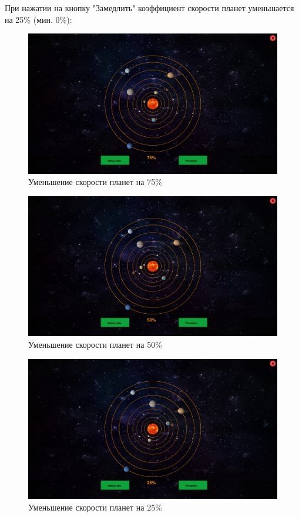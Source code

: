 \documentclass[14pt, oneside]{altsu-report}
\begin{document}
При нажатии на кнопку "Замедлить" коэффициент скорости планет уменьшается на 25\% (мин. 0\%):
\begin{figure}[H]
    \centering
    \includegraphics[width=0.8\linewidth]{src/test/down_quarter1.png}
    \caption{Уменьшение скорости планет на 75\%}
    \label{fig:up-75}
\end{figure}
\begin{figure}[H]
    \centering
    \includegraphics[width=0.8\linewidth]{src/test/down_ quarter2.png}
    \caption{Уменьшение скорости планет на 50\%}
    \label{fig:up-50}
\end{figure}
\begin{figure}[H]
    \centering
    \includegraphics[width=0.8\linewidth]{src/test/down_ quarter3.png}
    \caption{Уменьшение скорости планет на 25\%}
    \label{fig:up-25}
\end{figure}
\end{document}
